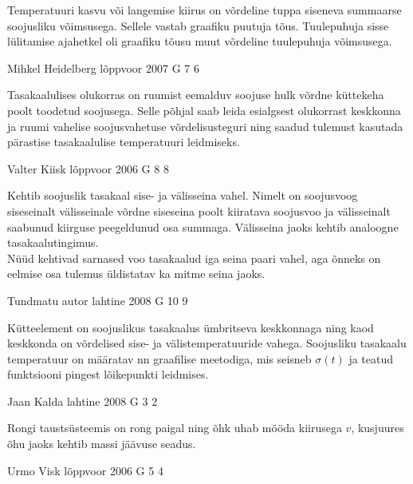 \documentclass[11pt, twoside]{article}
\begin{document}
{{\ifHint
Temperatuuri kasvu või langemise kiirus on võrdeline tuppa siseneva summaarse soojusliku võimsusega. Sellele vastab graafiku puutuja tõus. Tuulepuhuja sisse lülitamise ajahetkel oli graafiku tõusu muut võrdeline tuulepuhuja võimsusega.
\fi
}

{Mihkel Heidelberg} %
{lõppvoor} %
{2007} %
{G 7} %
{6} %
{

\ifHint
Tasakaalulises olukorras on ruumist eemalduv soojuse hulk võrdne küttekeha poolt toodetud soojusega. Selle põhjal saab leida esialgsest olukorrast keskkonna ja ruumi vahelise soojusvahetuse võrdelisusteguri ning saadud tulemust kasutada pärastise tasakaalulise temperatuuri leidmiseks.
\fi
}

{Valter Kiisk} %
{lõppvoor} %
{2006} %
{G 8} %
{8} %
{

\ifHint
\osa Kehtib soojuslik tasakaal sise- ja välisseina vahel. Nimelt on soojusvoog siseseinalt välisseinale võrdne siseseina poolt kiiratava soojusvoo ja välisseinalt saabunud kiirguse peegeldunud osa summaga. Välisseina jaoks kehtib analoogne tasakaalutingimus.\\
\osa Nüüd kehtivad sarnased voo tasakaalud iga seina paari vahel, aga õnneks on eelmise osa tulemus üldistatav ka mitme seina jaoks.
\fi
}

{Tundmatu autor} %
{lahtine} %
{2008} %
{G 10} %
{9} %
{

\ifHint
Kütteelement on soojuslikus tasakaalus ümbritseva keskkonnaga ning kaod keskkonda on võrdelised sise- ja välistemperatuuride vahega. Soojusliku tasakaalu temperatuur on määratav nn graafilise meetodiga, mis seisneb $\sigma (t)$ ja teatud funktsiooni pingest lõikepunkti leidmises.
\fi
}

{Jaan Kalda} %
{lahtine} %
{2008} %
{G 3} %
{2} %
{

\ifHint
Rongi taustsüsteemis on rong paigal ning õhk uhab mööda kiirusega $v$, kusjuures õhu jaoks kehtib massi jäävuse seadus.
\fi
}

{Urmo Visk} %
{lõppvoor} %
{2006} %
{G 5} %
{4} %
{

}}
\end{document}
